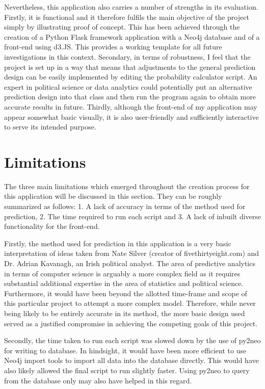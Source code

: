 Nevertheless, this application also carries a number of strengths in its evaluation. Firstly, it is functional and it therefore fulfils the main objective of the project simply by illustrating proof of concept. This has been achieved through the creation of a Python Flask framework application with a Neo4j database and of a front-end using d3.JS. This provides a working template for all future investigations in this context.  Secondary, in terms of robustness, I feel that the project is set up in a way that means that adjustments to the general prediction design can be easily implemented by editing the probability calculator script. An expert in political science or data analytics could potentially put an alternative prediction design into that class and then run the program again to obtain more accurate results in future.  Thirdly, although the front-end of my application may appear somewhat basic visually, it is also user-friendly and sufficiently interactive to serve its intended purpose. 
\section{Limitations}
The three main limitations which emerged throughout the creation process for this application will be discussed in this section. They can be roughly summarized as follows: 1. A lack of accuracy in terms of the method used for prediction, 2. The time required to run each script and 3. A lack of inbuilt diverse functionality for the front-end.
   
Firstly, the method used for prediction in this application is a very basic interpretation of ideas taken from Nate Silver (creator of fivethirtyeight.com) and Dr. Adrian Kavanagh, an Irish political analyst. 
The area of predictive analytics in terms of computer science is arguably a more complex field as it requires substantial additional expertise in the area of statistics and political science. Furthermore, it would have been beyond the allotted time-frame and scope of this particular project to attempt a more complex model. Therefore, while never being likely to be entirely accurate in its method, the more basic design used served as a justified compromise in achieving the competing goals of this project. 

Secondly, the time taken to run each script was slowed down by the use of py2neo for writing to database. In hindsight, it would have been more efficient to use Neo4j import tools to import all data into the database directly. This would have also likely allowed the final script to run slightly faster. Using py2neo to query from the database only may also have helped in this regard.

